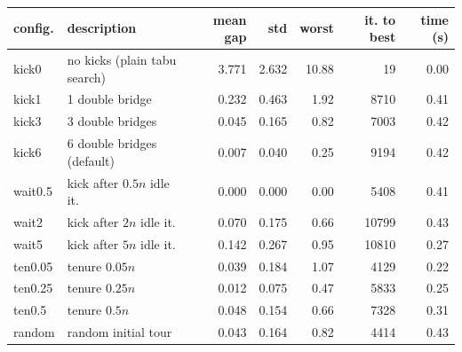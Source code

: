 \begin{tabular}{llrrrrr}
\toprule
config. & description & mean gap & std & worst & it. to best & time (s) \\
\midrule
kick0 & no kicks (plain tabu search) & 3.771 & 2.632 & 10.88 & 19 & 0.00 \\
kick1 & 1 double bridge & 0.232 & 0.463 & 1.92 & 8710 & 0.41 \\
kick3 & 3 double bridges & 0.045 & 0.165 & 0.82 & 7003 & 0.42 \\
kick6 & 6 double bridges (default) & 0.007 & 0.040 & 0.25 & 9194 & 0.42 \\
wait0.5 & kick after $0.5n$ idle it. & 0.000 & 0.000 & 0.00 & 5408 & 0.41 \\
wait2 & kick after $2n$ idle it. & 0.070 & 0.175 & 0.66 & 10799 & 0.43 \\
wait5 & kick after $5n$ idle it. & 0.142 & 0.267 & 0.95 & 10810 & 0.27 \\
ten0.05 & tenure $0.05n$ & 0.039 & 0.184 & 1.07 & 4129 & 0.22 \\
ten0.25 & tenure $0.25n$ & 0.012 & 0.075 & 0.47 & 5833 & 0.25 \\
ten0.5 & tenure $0.5n$ & 0.048 & 0.154 & 0.66 & 7328 & 0.31 \\
random & random initial tour & 0.043 & 0.164 & 0.82 & 4414 & 0.43 \\
\bottomrule
\end{tabular}
